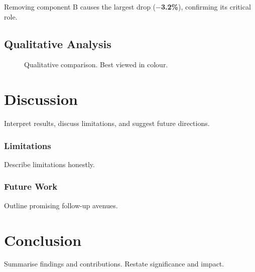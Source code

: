 \documentclass[10pt,a4paper]{article}
\begin{document}
\begin{highlightbox}
Removing component B causes the largest drop
(\textbf{\color{jluRed}$-$3.2\%}), confirming its critical role.
\end{highlightbox}

\subsection{Qualitative Analysis}
\label{sec:qualitative}

\begin{figure}[H]
  \centering
  \caption{Qualitative comparison. Best viewed in colour.}
  \label{fig:qualitative}
\end{figure}

\section{Discussion}
\label{sec:discussion}

Interpret results, discuss limitations, and suggest future directions.

\subsubsection{Limitations}
Describe limitations honestly.

\subsubsection{Future Work}
Outline promising follow-up avenues.

\section{Conclusion}
\label{sec:conclusion}

Summarise findings and contributions. Restate significance and impact.

\end{document}
